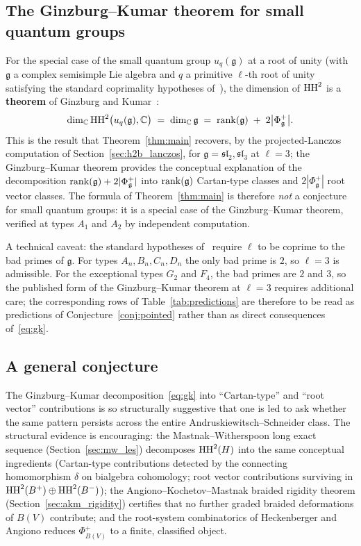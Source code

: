 \subsection{The Ginzburg--Kumar theorem for small quantum groups}
\label{sec:gk_theorem}

For the special case of the small quantum group $u_q(\mathfrak{g})$ at a root of unity (with $\mathfrak{g}$ a complex semisimple Lie algebra and $q$ a primitive $\ell$-th root of unity satisfying the standard coprimality hypotheses of~\cite{GK93}), the dimension of $\operatorname{HH}^2$ is a \textbf{theorem} of Ginzburg and Kumar~\cite{GK93}:
\begin{equation}
\label{eq:gk}
\dim_{\mathbb{C}} \operatorname{HH}^2\bigl(u_q(\mathfrak{g}), \mathbb{C}\bigr) \;=\; \dim_{\mathbb{C}} \mathfrak{g} \;=\; \operatorname{rank}(\mathfrak{g}) \;+\; 2\bigl|\Phi^+_\mathfrak{g}\bigr|.
\end{equation}
This is the result that Theorem~\ref{thm:main} recovers, by the projected-Lanczos computation of Section~\ref{sec:h2b_lanczos}, for $\mathfrak{g} = \mathfrak{sl}_2, \mathfrak{sl}_3$ at $\ell = 3$; the Ginzburg--Kumar theorem provides the conceptual explanation of the decomposition $\operatorname{rank}(\mathfrak{g}) + 2|\Phi^+_\mathfrak{g}|$ into $\operatorname{rank}(\mathfrak{g})$ Cartan-type classes and $2|\Phi^+_\mathfrak{g}|$ root vector classes. The formula of Theorem~\ref{thm:main} is therefore \emph{not} a conjecture for small quantum groups: it is a special case of the Ginzburg--Kumar theorem, verified at types $A_1$ and $A_2$ by independent computation.

A technical caveat: the standard hypotheses of~\cite{GK93} require $\ell$ to be coprime to the bad primes of $\mathfrak{g}$. For types $A_n, B_n, C_n, D_n$ the only bad prime is $2$, so $\ell = 3$ is admissible. For the exceptional types $G_2$ and $F_4$, the bad primes are $2$ and $3$, so the published form of the Ginzburg--Kumar theorem at $\ell = 3$ requires additional care; the corresponding rows of Table~\ref{tab:predictions} are therefore to be read as predictions of Conjecture~\ref{conj:pointed} rather than as direct consequences of~\eqref{eq:gk}.

\subsection{A general conjecture}
\label{sec:general_conjecture}

The Ginzburg--Kumar decomposition~\eqref{eq:gk} into ``Cartan-type'' and ``root vector'' contributions is so structurally suggestive that one is led to ask whether the same pattern persists across the entire Andruskiewitsch--Schneider class. The structural evidence is encouraging: the Mastnak--Witherspoon long exact sequence (Section~\ref{sec:mw_les}) decomposes $\operatorname{HH}^2(H)$ into the same conceptual ingredients (Cartan-type contributions detected by the connecting homomorphism $\delta$ on bialgebra cohomology; root vector contributions surviving in $\operatorname{HH}^2(B^{+}) \oplus \operatorname{HH}^2(B^{-})$); the Angiono--Kochetov--Mastnak braided rigidity theorem (Section~\ref{sec:akm_rigidity}) certifies that no further graded braided deformations of $B(V)$ contribute; and the root-system combinatorics of Heckenberger and Angiono reduces $\Phi^+_{B(V)}$ to a finite, classified object.

